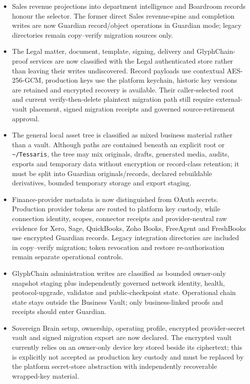 \documentclass[11pt]{article}
\newcommand{\code}[1]{\texttt{#1}}
\begin{document}
\begin{itemize}
  \item Sales revenue projections into department intelligence and Boardroom records honour the selector. The former direct Sales revenue-spine and completion writes are now Guardian record/object operations in Guardian mode; legacy directories remain copy--verify migration sources only.
  \item The Legal matter, document, template, signing, delivery and GlyphChain-proof services are now classified with the Legal authenticated store rather than leaving their writes undiscovered. Record payloads use contextual AES-256-GCM, production keys use the platform keychain, historic key versions are retained and encrypted recovery is available. Their caller-selected root and current verify-then-delete plaintext migration path still require external-vault placement, signed migration receipts and governed source-retirement approval.
  \item The general local asset tree is classified as mixed business material rather than a vault. Although paths are contained beneath an explicit root or \code{\textasciitilde/Tessaris}, the tree may mix originals, drafts, generated media, audits, exports and temporary data without encryption or record-class retention; it must be split into Guardian originals/records, declared rebuildable derivatives, bounded temporary storage and export staging.
  \item Finance-provider metadata is now distinguished from OAuth secrets. Production provider tokens are routed to platform key custody, while connection identity, scopes, connector receipts and provider-neutral raw evidence for Xero, Sage, QuickBooks, Zoho Books, FreeAgent and FreshBooks use encrypted Guardian records. Legacy integration directories are included in copy--verify migration; token revocation and restore re-authorisation remain separate operational controls.
  \item GlyphChain administration writes are classified as bounded owner-only snapshot staging plus independently governed network identity, health, protocol-upgrade, validator and public-checkpoint state. Operational chain state stays outside the Business Vault; only business-linked proofs and receipts should enter Guardian.
  \item Sovereign Brain setup, ownership, operating profile, encrypted provider-secret vault and signed migration export are now declared. The encrypted vault currently relies on an owner-only device key stored beside its ciphertext; this is explicitly not accepted as production key custody and must be replaced by the platform secret-store abstraction with independently recoverable wrapped-key material.

\end{itemize}
\end{document}
